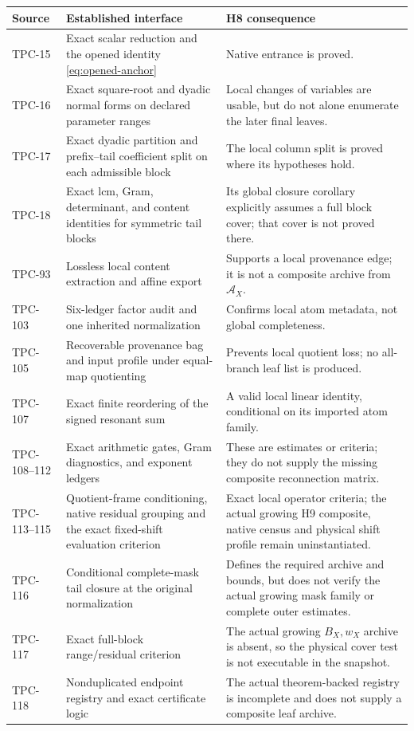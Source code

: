 \documentclass[11pt,a4paper]{article}
\theoremstyle{definition}
\theoremstyle{remark}
\newcommand{\cA}{\mathcal A}
\begin{document}
\begin{center}
\small
\begin{tabularx}{\textwidth}{@{}p{}p{}X@{}}
\toprule
Source & Established interface & H8 consequence\\
\midrule
TPC-15
& Exact scalar reduction and the opened identity
\eqref{eq:opened-anchor}
& Native entrance is proved.\\
TPC-16
& Exact square-root and dyadic normal forms on declared parameter
ranges \citep{WangTPC16}
& Local changes of variables are usable, but do not alone enumerate
the later final leaves.\\
TPC-17
& Exact dyadic partition and prefix--tail coefficient split on each
admissible block \citep{WangTPC17}
& The local column split is proved where its hypotheses hold.\\
TPC-18
& Exact lcm, Gram, determinant, and content identities for symmetric
tail blocks \citep{WangTPC18}
& Its global closure corollary explicitly assumes a full block cover;
that cover is not proved there.\\
TPC-93
& Lossless local content extraction and affine export
\citep{WangTPC93}
& Supports a local provenance edge; it is not a composite archive from
\(\cA_X\).\\
TPC-103
& Six-ledger factor audit and one inherited normalization
\citep{WangTPC103}
& Confirms local atom metadata, not global completeness.\\
TPC-105
& Recoverable provenance bag and input profile under equal-map
quotienting \citep{WangTPC105}
& Prevents local quotient loss; no all-branch leaf list is produced.\\
TPC-107
& Exact finite reordering of the signed resonant sum
\citep{WangTPC107}
& A valid local linear identity, conditional on its imported atom
family.\\
TPC-108--112
& Exact arithmetic gates, Gram diagnostics, and exponent ledgers
\citep{WangTPC108,WangTPC112}
& These are estimates or criteria; they do not supply the missing
composite reconnection matrix.\\
TPC-113--115
& Quotient-frame conditioning, native residual grouping and the exact
fixed-shift evaluation criterion
\citep{WangTPC113,WangTPC114,WangTPC115}
& Exact local operator criteria; the actual growing H9 composite,
native census and physical shift profile remain uninstantiated.\\
TPC-116
& Conditional complete-mask tail closure at the original
normalization \citep{WangTPC116}
& Defines the required archive and bounds, but does not verify the
actual growing mask family or complete outer estimates.\\
TPC-117
& Exact full-block range/residual criterion \citep{WangTPC117}
& The actual growing \(B_X,w_X\) archive is absent, so the physical
cover test is not executable in the snapshot.\\
TPC-118
& Nonduplicated endpoint registry and exact certificate logic
\citep{WangTPC118}
& The actual theorem-backed registry is incomplete and does not
supply a composite leaf archive.\\
\bottomrule
\end{tabularx}
\end{center}
\end{document}
